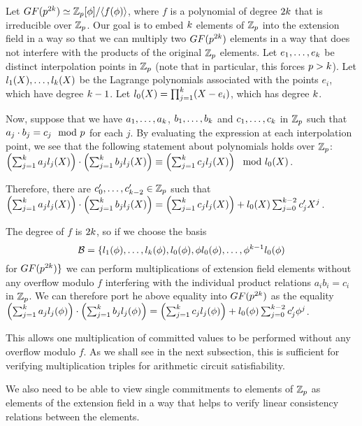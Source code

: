Let $GF(p^{2k}) \simeq \mathbb{Z}_p[\phi]/\langle f(\phi) \rangle$, where $f$ is a polynomial of degree $2k$ that is irreducible over $\mathbb{Z}_p$. Our goal is to embed $k$ elements of $\mathbb{Z}_p$ into the extension field in a way so that we can multiply two $GF(p^{2k})$ elements in a way that does not interfere with the products of the original $\mathbb{Z}_p$ elements. Let $e_1,\ldots,e_k$ be distinct interpolation points in $\mathbb{Z}_p$ (note that in particular, this forces $p>k$). Let $l_1(X),\ldots,l_k(X)$ be the Lagrange polynomials associated with the points $e_i$, which have degree $k-1$. Let $l_0(X) = \prod_{j=1}^k (X-e_i)$, which has degree $k$.

Now, suppose that we have $a_1,\ldots,a_k$, $b_1,\ldots,b_k$ and $c_1,\ldots,c_k$ in $\mathbb{Z}_p$ such that $a_j \cdot b_j = c_j \mod {p}$ for each $j$. By evaluating the expression at each interpolation point, we see that the following statement about polynomials holds over $\mathbb{Z}_p$: $ \left( \sum_{j=1}^k a_j l_j(X) \right) \cdot \left( \sum_{j=1}^k b_j l_j(X) \right) \equiv \left( \sum_{j=1}^k c_j l_j(X) \right) \mod l_0(X)$.

Therefore, there are $c'_0,\ldots,c'_{k-2}\in \mathbb{Z}_p$ such that $\left( \sum_{j=1}^k a_j l_j(X) \right) \cdot \left( \sum_{j=1}^k b_j l_j(X) \right) = \left( \sum_{j=1}^k c_j l_j(X) \right) + l_0(X) \sum_{j=0}^{k-2} c'_j X^j$.

The degree of $f$ is $2k$, so if we choose the basis
\[\mathcal{B} = \{ l_1(\phi),\ldots,l_k(\phi),l_0(\phi),\phi l_0(\phi),\ldots,\phi^{k-1} l_0(\phi)\]
for $GF(p^{2k}) \}$ we can perform multiplications of extension field elements without any overflow modulo $f$ interfering with the individual product relations $a_i b_i = c_i$ in $\mathbb{Z}_p$. We can therefore port he above equality into $GF(p^{2k})$ as the equality $\left( \sum_{j=1}^k a_j l_j(\phi) \right) \cdot \left( \sum_{j=1}^k b_j l_j(\phi) \right) = \left( \sum_{j=1}^k c_j l_j(\phi) \right) + l_0(\phi) \sum_{j=0}^{k-2} c'_j \phi^j$.

This allows one multiplication of committed values to be performed without any overflow modulo $f$. As we shall see in the next subsection, this is sufficient for verifying multiplication triples for arithmetic circuit satisfiability.

We also need to be able to view single commitments to elements of $\mathbb{Z}_p$ as elements of the extension field in a way that helps to verify linear consistency relations between the elements.

